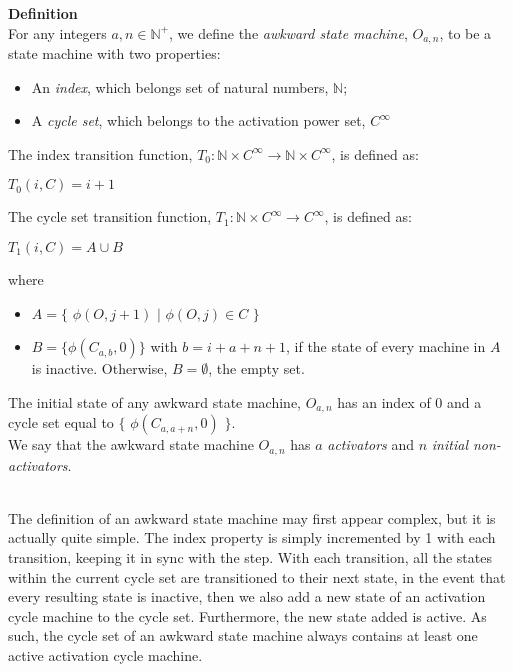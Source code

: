 \documentclass[a4paper,12pt]{article}
\begin{document}
\label{definition:awkward_state_machine}
\hypertarget{definition:awkward_state_machine}{}
\begin{tcolorbox}
\textbf{Definition}\\
For any integers $a, n \in \mathbb{N^+}$, we define the \textit{awkward state machine}, $O_{a,n}$, to be a state machine with two properties:

\begin{itemize}
\item An \textit{index}, which belongs set of natural numbers, $\mathbb{N}$;

\item A \textit{cycle set}, which belongs to the activation power set, $ C^{\infty}$

\end{itemize}

The index transition function, $T_0: \mathbb{N} \times C^{\infty} \rightarrow \mathbb{N} \times C^{\infty}$, is defined as:
\begin{center}
$T_0(i, C) = i + 1$
\end{center}

The cycle set transition function, $T_1: \mathbb{N} \times C^{\infty} \rightarrow C^{\infty}$, is defined as:
\begin{center}
$T_1(i, C) = A \cup B$
\end{center}
where
\begin{itemize}
\item $A = \{$ $\phi(O, j + 1)$ $|$ $\phi(O, j) \in C$ $\}$

\item $B = \{ \phi(C_{a, b}, 0) \}$ with $b = i + a + n + 1$, if the state of every machine in $A$ is inactive. Otherwise, $B = \emptyset$, the empty set.
\end{itemize}

The initial state of any awkward state machine, $O_{a,n}$ has an index of $0$ and a cycle set equal to $\{$ $\phi(C_{a, a + n}, 0)$ $\}$.\\

We say that the awkward state machine $O_{a,n}$ has $a$ \textit{activators} and $n$ \textit{initial non-activators}.
\end{tcolorbox}



\noindent \\ The definition of an awkward state machine may first appear complex, but it is actually quite simple. The index property is simply incremented by 1 with each transition, keeping it in sync with the step. With each transition, all the states within the current cycle set are transitioned to their next state, in the event that every resulting state is inactive, then we also add a new state of an activation cycle machine to the cycle set. Furthermore, the new state added is active. As such, the cycle set of an awkward state machine always contains at least one active activation cycle machine.\\
\end{document}
